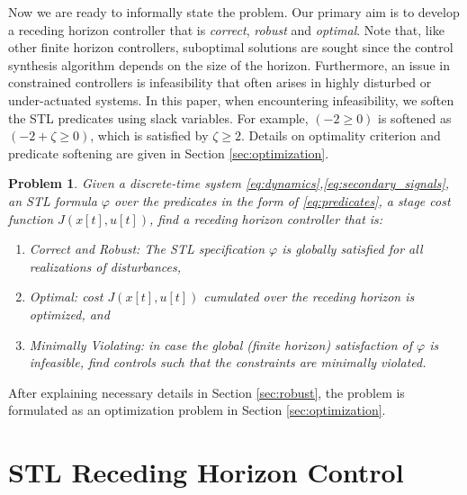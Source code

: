 \documentclass[letterpaper, 10 pt, conference]{ieeeconf}
\newtheorem{problem}{Problem}
\begin{document}
Now we are ready to informally state the problem. Our primary aim is to develop a receding horizon controller that is \emph{correct}, \emph{robust} and \emph{optimal}. 
Note that, like other finite horizon controllers, suboptimal solutions are sought since the control synthesis algorithm depends on the size of the horizon. Furthermore, an issue in constrained controllers is infeasibility that often arises in highly disturbed or under-actuated systems. In this paper, when encountering infeasibility, we soften the STL predicates using slack variables. For example, $(-2 \geq 0)$ is softened as $(-2+\zeta \geq 0)$, which is satisfied by $\zeta \ge 2$.  Details on optimality criterion and predicate softening are given in Section \ref{sec:optimization}. 
\begin{problem}
\label{problem:problem}
Given a discrete-time system \eqref{eq:dynamics},\eqref{eq:secondary_signals}, an STL formula $\varphi$ over the predicates in the form of \eqref{eq:predicates}, a stage cost function $J(x[t],u[t])$, find a receding horizon controller that is:
\begin{enumerate}
\item Correct and Robust: The STL specification $\varphi$ is globally satisfied for all realizations of disturbances,
\item Optimal: cost $J(x[t],u[t])$ cumulated over the receding horizon is optimized, and
\item Minimally Violating: in case the global (finite horizon) satisfaction of $\varphi$ is infeasible, find controls such that the constraints are minimally violated.
\end{enumerate}
\end{problem}
After explaining necessary details in Section \ref{sec:robust}, the problem is formulated as an optimization problem in Section \ref{sec:optimization}. 






\section{STL Receding Horizon Control}
\label{sec:rhc}
\end{document}
